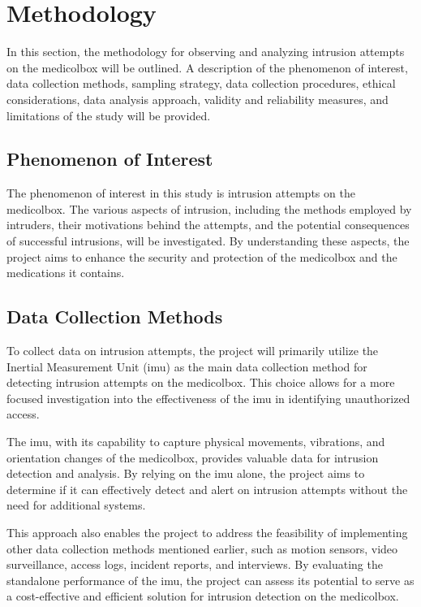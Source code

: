 \documentclass[../main.tex]{subfiles}
\begin{document}
    \section{Methodology}
    In this section, the methodology for observing and
    analyzing \gls{intrusion} attempts on the
    \gls{medicolbox} will be outlined.
    A description of the phenomenon of interest,
    data collection methods, sampling strategy,
    data collection procedures, ethical considerations,
    data analysis approach, validity and reliability measures,
    and limitations of the study will be provided.

    \subsection{Phenomenon of Interest}
    The phenomenon of interest in this study is
    \gls{intrusion} attempts on the \gls{medicolbox}.
    The various aspects of \gls{intrusion},
    including the methods employed by intruders,
    their motivations behind the attempts,
    and the potential consequences of successful \glspl{intrusion},
    will be investigated. By understanding these aspects,
    the project aims to enhance the
    security and protection of the
    \gls{medicolbox} and the medications it contains.

    \subsection{Data Collection Methods}
    To collect data on \gls{intrusion} attempts,
    the project will primarily utilize the
    Inertial Measurement Unit (\gls{imu}) as the
    main data collection method for detecting
    \gls{intrusion} attempts on the \gls{medicolbox}.
    This choice allows for a more focused investigation into the
    effectiveness of the \gls{imu} in identifying unauthorized access.

    The \gls{imu}, with its capability to capture physical movements,
    vibrations, and orientation changes of the \gls{medicolbox},
    provides valuable data for \gls{intrusion} detection and analysis.
    By relying on the \gls{imu} alone,
    the project aims to determine if it can effectively detect and
    alert on \gls{intrusion} attempts without the
    need for additional systems.

    This approach also enables the project to address the
    feasibility of implementing other
    data collection methods mentioned earlier,
    such as motion sensors, video surveillance,
    access logs, incident reports, and interviews.
    By evaluating the standalone performance of the \gls{imu},
    the project can assess its potential to serve as a cost-effective and
    efficient solution for \gls{intrusion} detection on the \gls{medicolbox}.
\end{document}
